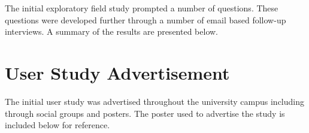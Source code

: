 The initial exploratory field study prompted a number of questions. These questions were developed further through a number of email based follow-up interviews. A summary of the results are presented below.




\chapter{User Study Advertisement}
\label{appendix:user-study-advertisement}

The initial user study was advertised throughout the university campus including through social groups and posters. The poster used to advertise the study is included below for reference.

\begin{center}
\end{center}

